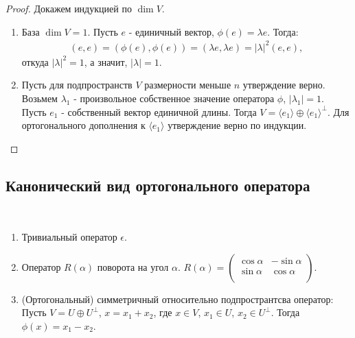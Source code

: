 \begin{proof}
    Докажем индукцией по $\dim V$.
    \begin{enumerate}
        \item База $\dim V = 1$. Пусть $e$ - единичный вектор, $\phi(e) = \lambda e$. Тогда:
        \begin{gather*}
            (e, e) = (\phi(e), \phi(e)) = (\lambda e, \lambda e) = |\lambda|^2 (e, e),
        \end{gather*}
        откуда $|\lambda|^2 = 1$, а значит, $|\lambda| = 1$.
        \item Пусть для подпространств $V$ размерности меньше $n$ утверждение верно. Возьмем 
        $\lambda_1$ - произвольное собственное значение оператора $\phi$, $|\lambda_1| = 1$.
        Пусть $e_1$ - собственный вектор единичной длины. Тогда $V = \langle e_1 \rangle \oplus 
        \langle e_1 \rangle^{\perp}$. Для ортогонального дополнения к $\langle e_1 \rangle$ 
        утверждение верно по индукции.
    \end{enumerate}
\end{proof}

\subsection{Канонический вид ортогонального оператора}

\begin{example}~
    \begin{enumerate}
        \item Тривиальный оператор $\epsilon$.
        \item Оператор $R(\alpha)$ поворота на угол $\alpha$.
        $R(\alpha) = 
         \begin{pmatrix}
        \cos{\alpha}  & -\sin{\alpha} \\
		\sin{\alpha} & \cos{\alpha} \\
        \end{pmatrix}$.
        \item (Ортогональный) симметричный относительно подпространтсва оператор: \\
        Пусть $V = U \oplus U^{\perp}$, $x = x_1 + x_2$, где $x \in V$, $x_1 \in U$, $x_2 \in U^{\perp}$.
        Тогда $\phi(x) = x_1 - x_2$.
    \end{enumerate}
\end{example}

